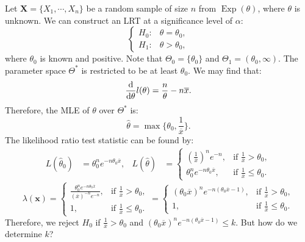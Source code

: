 \documentclass{huhtakm-template-book-v2}
\DeclareMathOperator{\Exp}{Exp}
\begin{document}
    \begin{eg}
        Let $\mathbf{X}=\{X_{1},\cdots,X_{n}\}$ be a random sample of size $n$ from $\Exp(\theta)$, where $\theta$ is unknown. We can construct an LRT at a significance level of $\alpha$:
        \begin{equation*}
            \begin{cases}
                H_{0}: &\theta=\theta_{0},\\
                H_{1}: &\theta>\theta_{0},
            \end{cases}
        \end{equation*}
        where $\theta_{0}$ is known and positive. Note that $\Theta_{0}=\{\theta_{0}\}$ and $\Theta_{1}=(\theta_{0},\infty)$. The parameter space $\Theta^{*}$ is restricted to be at least $\theta_{0}$. We may find that:
        \begin{equation*}
            \odv*{l(\theta)}{\theta}=\frac{n}{\theta}-n\overline{x}.
        \end{equation*}
        Therefore, the MLE of $\theta$ over $\Theta^{*}$ is:
        \begin{equation*}
            \hat{\theta}=\max\biggl\{\theta_{0},\frac{1}{\overline{x}}\biggr\}.
        \end{equation*}
        The likelihood ratio test statistic can be found by:
        \begin{align*}
            L(\hat{\theta}_{0})&=\theta_{0}^{n}e^{-n\theta_{0}\overline{x}}, & L(\hat{\theta})&=\begin{cases}
                \left(\frac{1}{\overline{x}}\right)^{n}e^{-n}, &\text{if }\frac{1}{\overline{x}}>\theta_{0},\\
                \theta_{0}^{n}e^{-n\theta_{0}\overline{x}}, &\text{if }\frac{1}{\overline{x}}\leq\theta_{0}.
            \end{cases}
        \end{align*}
        \begin{equation*}
            \lambda(\mathbf{x})=\begin{cases}
                \frac{\theta_{0}^{n}e^{-n\theta_{0}\overline{x}}}{(\overline{x})^{-n}e^{-n}}, &\text{if }\frac{1}{\overline{x}}>\theta_{0},\\
                1, &\text{if }\frac{1}{\overline{x}}\leq\theta_{0}.
            \end{cases}=\begin{cases}
                (\theta_{0}\overline{x})^{n}e^{-n(\theta_{0}\overline{x}-1)}, &\text{if }\frac{1}{\overline{x}}>\theta_{0},\\
                1, &\text{if }\frac{1}{\overline{x}}\leq\theta_{0}.
            \end{cases}
        \end{equation*}
        Therefore, we reject $H_{0}$ if $\frac{1}{\overline{x}}>\theta_{0}$ and $(\theta_{0}\overline{x})^{n}e^{-n(\theta_{0}\overline{x}-1)}\leq k$. But how do we determine $k$?
        

\end{eg}
\end{document}
